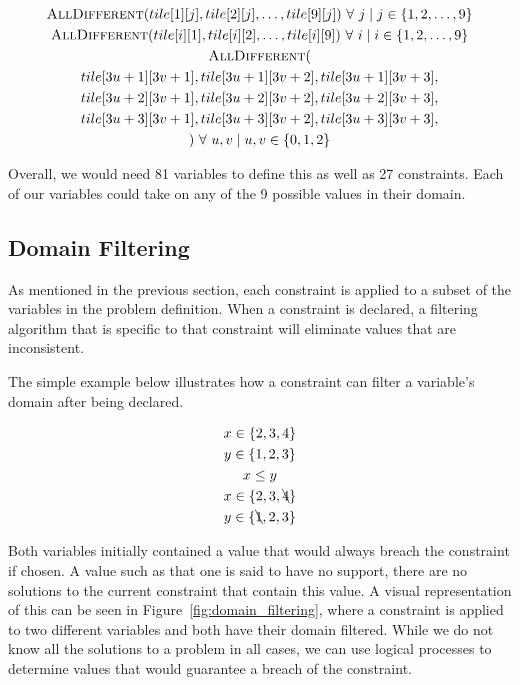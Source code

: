 \documentclass[../Document.tex]{subfiles}
\begin{document}
\begin{gather*}
    \mbox{\sc AllDifferent}(tile[1][j], tile[2][j], \dots, tile[9][j])\ \forall\ j \mid j \in \{1,2,\dots,9\} \\
    \mbox{\sc AllDifferent}(tile[i][1], tile[i][2], \dots, tile[i][9])\ \forall\ i \mid i \in \{1,2,\dots,9\} \\
    \mbox{\sc AllDifferent}(\\
        tile[3u+1][3v+1],tile[3u+1][3v+2],tile[3u+1][3v+3],\\
        tile[3u+2][3v+1],tile[3u+2][3v+2],tile[3u+2][3v+3],\\
        tile[3u+3][3v+1],tile[3u+3][3v+2],tile[3u+3][3v+3],\\
    )\ \forall\ u,v \mid u,v \in \{0,1,2\}
\end{gather*}

Overall, we would need 81 variables to define this \csp as well as 27 constraints. Each of our variables could take on any of the 9 possible values in their domain.

\subsection{Domain Filtering}
As mentioned in the previous section, each constraint is applied to a subset of the variables in the problem definition. When a constraint is declared, a filtering algorithm that is specific to that constraint will eliminate values that are inconsistent.

The simple example below illustrates how a constraint can filter a variable's domain after being declared.

\begin{gather*}
    x \in \{2,3,4\}\\
    y \in \{1,2,3\}\\
    x \leq y\\
    x \in \{2,3,\bcancel{4}\}\\
    y \in \{\bcancel{1},2,3\}
\end{gather*}

Both variables initially contained a value that would always breach the constraint if chosen. A value such as that one is said to have no support, \ie there are no solutions to the current constraint that contain this value. A visual representation of this can be seen in Figure~\ref{fig:domain_filtering}, where a constraint is applied to two different variables and both have their domain filtered. While we do not know all the solutions to a problem in all cases, we can use logical processes to determine values that would guarantee a breach of the constraint.
\end{document}
